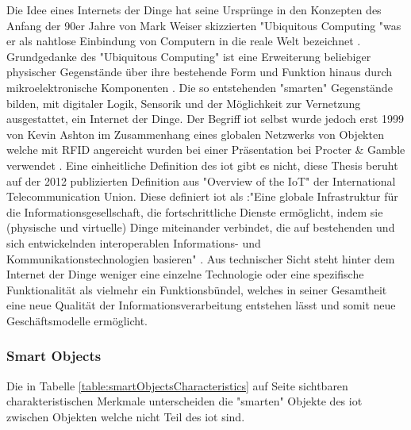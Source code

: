 \documentclass[a4paper, 12pt, twoside, headsepline=true]{scrartcl} %
\begin{document}
Die Idee eines Internets der Dinge hat seine Ursprünge in den Konzepten des Anfang der 90er Jahre von Mark Weiser skizzierten "Ubiquitous Computing "was er als nahtlose Einbindung von Computern in die reale Welt bezeichnet \cite{ucweiser}. 
Grundgedanke des "Ubiquitous Computing" ist eine Erweiterung beliebiger physischer Gegenstände über ihre bestehende Form und Funktion hinaus durch mikroelektronische Komponenten \cite{237456}. Die so entstehenden "smarten" Gegenstände bilden, mit digitaler Logik, Sensorik und der Möglichkeit zur Vernetzung ausgestattet, ein Internet der Dinge. Der Begriff \acl{iot} selbst wurde jedoch erst 1999 von Kevin Ashton im Zusammenhang eines globalen Netzwerks von Objekten welche mit RFID angereicht wurden bei einer Präsentation bei Procter \& Gamble verwendet \cite{rfidiot}. Eine einheitliche Definition des \ac{iot} gibt es nicht, diese Thesis beruht auf der 2012 publizierten Definition aus "Overview of the IoT" der International Telecommunication Union. Diese definiert \ac{iot} als :"Eine globale Infrastruktur für die Informationsgesellschaft, die fortschrittliche Dienste ermöglicht, indem sie (physische und virtuelle) Dinge miteinander verbindet, die auf bestehenden und sich entwickelnden interoperablen Informations- und Kommunikationstechnologien basieren" \cite{iotdefinition}.
Aus technischer Sicht steht hinter dem Internet der Dinge weniger eine einzelne Technologie oder eine spezifische Funktionalität als vielmehr ein Funktionsbündel, welches in seiner Gesamtheit eine neue Qualität der Informationsverarbeitung entstehen lässt und somit neue Geschäftsmodelle ermöglicht.

\subsubsection{Smart Objects}
 Die in Tabelle \ref{table:smartObjectsCharacteristics} auf Seite \pageref{table:smartObjectsCharacteristics} sichtbaren charakteristischen Merkmale unterscheiden die "smarten" Objekte des \ac{iot} zwischen Objekten welche nicht Teil des \ac{iot} sind.
\end{document}
